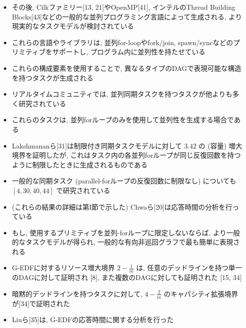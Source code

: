 \begin{frame}{}
    \begin{itemize}
        \item その後, Cilkファミリー[13, 21]やOpenMP[41], インテルのThread Building Blocks[43]などの一般的な並列プログラミング言語によって生成される, より現実的なタスクモデルが検討されている
\item これらの言語やライブラリは, 並列for-loopやfork/join, spawn/syncなどのプリミティブをサポートし, プログラム内に並列性を持たせている
\item これらの構成要素を使用することで, 異なるタイプのDAGで表現可能な構造を持つタスクが生成される
    \end{itemize}
\end{frame}

\begin{frame}{}
    \begin{itemize}
        \item リアルタイムコミュニティでは, 並列同期タスクを持つタスクが他よりも多く研究されている
\item これらのタスクは, 並列forループのみを使用して並列性を生成する場合である
\item Lakshmananら[31]は制限付き同期タスクモデルに対して $3.42$ の (容量) 増大境界を証明したが, これはタスク内の各並列forループが同じ反復回数を持つように制限したときに生成されるものである
\item 一般的な同期タスク (parallel-forループの反復回数に制限なし) についても $[4,30,40,44]$ で研究されている
\item (これらの結果の詳細は第I節で示した) Chwaら[20]は応答時間の分析を行っている
    \end{itemize}
\end{frame}

\begin{frame}{}
    \begin{itemize}
        \item もし, 使用するプリミティブを並列-forループに限定しないならば, より一般的なタスクモデルが得られ, 一般的な有向非巡回グラフで最も簡単に表現される
\item G-EDFに対するリソース増大境界 $2-\frac{1}{m}$ は, 任意のデッドラインを持つ単一のDAGに対して証明され [8], また複数のDAGに対しても証明された [15, 34]
\item 暗黙的デッドラインを持つタスクに対して, $4-\frac{2}{m}$ のキャパシティ拡張境界が[34]で証明された
\item Liuら[35]は, G-EDFの応答時間に関する分析を行った
    \end{itemize}
\end{frame}

